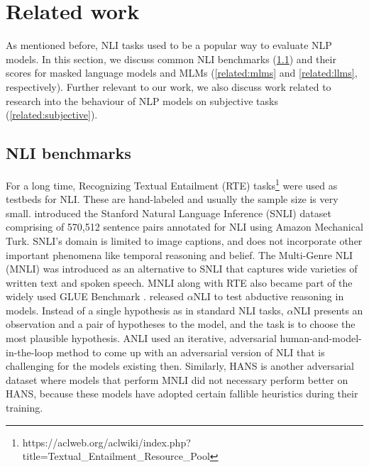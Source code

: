 \section{Related work}

As mentioned before, NLI tasks used to be a popular way to evaluate NLP models.
In this section, we discuss common NLI benchmarks (\cref{related:benchmarks}) and their scores for masked language models and MLMs (\cref{related:mlms} and \cref{related:llms}, respectively).
Further relevant to our work, we also discuss work related to research into the behaviour of NLP models on subjective tasks (\cref{related:subjective}).

\subsection{NLI benchmarks}
\label{related:benchmarks}

For a long time, Recognizing Textual Entailment (RTE) tasks\footnote{https://aclweb.org/aclwiki/index.php?\\title=Textual\_Entailment\_Resource\_Pool}  were used as testbeds for NLI. These are hand-labeled and usually the sample size is very small.
\citet{bowman-etal-2015-large} introduced the Stanford Natural Language Inference (SNLI) dataset comprising of 570,512 sentence pairs annotated for NLI using Amazon Mechanical Turk. SNLI's domain is limited to image captions, and does not incorporate other important phenomena like temporal reasoning and belief.
The Multi-Genre NLI (MNLI) \citep{williams-etal-2018-broad} was introduced as an alternative to SNLI that captures wide varieties of written text and spoken speech.
MNLI along with RTE also became part of the widely used GLUE Benchmark \citep{wang2019glue}.
\citet{bhagavatula2020abductive} released $\alpha$NLI to test abductive reasoning in models. Instead of a single hypothesis as in standard NLI tasks, $\alpha$NLI presents an observation and a pair of hypotheses to the model, and the task is to choose the most plausible hypothesis.
ANLI \citep{nie-etal-2020-adversarial} used an iterative, adversarial human-and-model-in-the-loop method to come up with an adversarial version of NLI that is challenging for the models existing then.
Similarly, HANS \citep{mccoy-etal-2019-right} is another adversarial dataset where models that perform MNLI did not necessary perform better on HANS, because these models have adopted certain fallible heuristics during their training.

